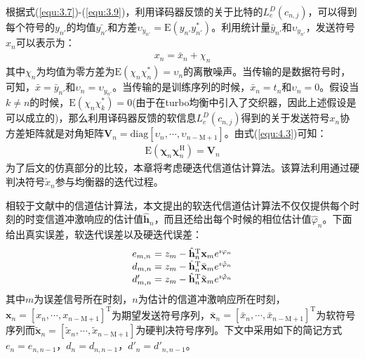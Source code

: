 根据式(\ref{equ:3.7})-(\ref{equ:3.9})，利用译码器反馈的关于比特的$L_e^D(c_{n,j})$，可以得到每个符号的$y_{{n}'}$的均值$\bar{y_{{n}'}}$和方差$\upsilon_{y_{{n}'}}=\mathrm{E}(y_{{n}'}y_{{n}'}^*)$。利用统计量$\bar{y}_{{n}'}$和$\upsilon_{y_{{n}'}}$，发送符号$x_n$可以表示为：
\begin{eqnarray}
    x_n=\bar{x}_n+\chi_n
    \label{equ:4.3}
\end{eqnarray}
其中$\chi_n$为均值为零方差为$\mathrm{E}(\chi_n\chi_n^*)=\upsilon_n$的离散噪声。当传输的是数据符号时，可知，$\bar{x}=\bar{y}_{{n}'}$和$\upsilon_n=\upsilon_{y_{{n}'}}$。当传输的是训练序列的时候，$\bar{x}_n=t_n$和$\upsilon_n=0$。假设当$k\neq
n$的时候，$\mathrm{E}(\chi_n\chi_k^*)=0$(由于在turbo均衡中引入了交织器，因此上述假设是可以成立的)，那么利用译码器反馈的软信息$L_e^D(c_{n,j})$得到的关于发送符号$x_n$协方差矩阵就是对角矩阵$\mathbf{V}_n=\mathrm{diag}[\upsilon_n,\cdots,\upsilon_{n-\mathrm{M}+1}]$。由式(\ref{equ:4.3})可知：
\begin{eqnarray}
    \mathrm{E}(\boldsymbol{\chi}_n\boldsymbol{\chi}_n^{\mathrm{H}})=\mathbf{V}_n
    \label{equ:4.4}
\end{eqnarray}
为了后文的仿真部分的比较，本章将考虑硬迭代信道估计算法。该算法利用通过硬判决符号$\tilde{x}_n$参与均衡器的迭代过程。

相较于文献中的信道估计算法，本文提出的软迭代信道估计算法不仅仅提供每个时刻的时变信道冲激响应的估计值$\hat{\mathbf{h}}_n$，而且还给出每个时候的相位估计值$\hat{\varphi}_n$。下面给出真实误差，软迭代误差以及硬迭代误差：
\begin{eqnarray}
    \begin{array}{l@{\;=\;}l}
        e_{m,n}&z_m-\hat{\mathbf{h}}_n^{\mathrm{T}}\mathbf{x}_me^{\imath\varphi_n}\\
        d_{m,n}&z_m-\hat{\mathbf{h}}_n^{\mathrm{T}}\bar{\mathbf{x}}_me^{\imath\hat{\varphi}_n}\\
        {d}'_{m,n}&z_m-\hat{\mathbf{h}}_n^{\mathrm{T}}\tilde{\mathbf{x}}_me^{\imath\tilde{\varphi}_n}\\
    \end{array}
    \label{equ:4.5}
\end{eqnarray}
其中$m$为误差信号所在时刻，$n$为估计的信道冲激响应所在时刻，$\mathbf{x}_n=[x_n,\cdots,x_{n-\mathrm{M}+1}]^{\mathrm{T}}$为期望发送符号序列，$\bar{\mathbf{x}}_n=[\bar{x}_n,\cdots,\bar{x}_{n-\mathrm{M}+1}]^{\mathrm{T}}$为软符号序列而$\tilde{\mathbf{x}}_n=[\tilde{x}_n,\cdots,\tilde{x}_{n-\mathrm{M}+1}]$为硬判决符号序列。下文中采用如下的简记方式$e_n=e_{n,n-1}\mbox{，}d_n=d_{n,n-1}\mbox{，}{d}'_n={d}'_{n,n-1}$。
